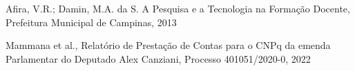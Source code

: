 \documentclass[
12pt,		%
openright,	%
twoside,  %
a4paper,			%
chapter=TITLE,		%
english,			%
french,				%
spanish,			%
brazil				%
]{USPSC-classe/USPSC}
\begin{document}
\begin{flushleft}
\begin{flushleft}
\begin{flushleft}
\begin{flushleft}
\begin{flushleft}
\begin{flushleft}
\begin{flushleft}
\begin{flushleft}
\begin{flushleft}
[AFIRA, 2013] Afira, V.R.; Damin, M.A. da S. A Pesquisa e a Tecnologia na Forma\c{c}\~ao Docente, Prefeitura Municipal de Campinas, 2013
\end{flushleft}


\end{flushleft}


\end{flushleft}


\end{flushleft}


\end{flushleft}


\end{flushleft}


\end{flushleft}


\end{flushleft}


\end{flushleft}


\begin{flushleft}
\begin{flushleft}
\begin{flushleft}
\begin{flushleft}
\begin{flushleft}
\begin{flushleft}
\begin{flushleft}
\begin{flushleft}
\begin{flushleft}
[WASHCNPq, 2022] Mammana et al., Relat\'orio de Presta\c{c}\~ao de Contas para o CNPq da emenda Parlamentar do Deputado Alex Canziani, Processo 401051/2020-0, 2022
\end{flushleft}


\end{flushleft}


\end{flushleft}


\end{flushleft}


\end{flushleft}


\end{flushleft}


\end{flushleft}


\end{flushleft}


\end{flushleft}
\end{document}

